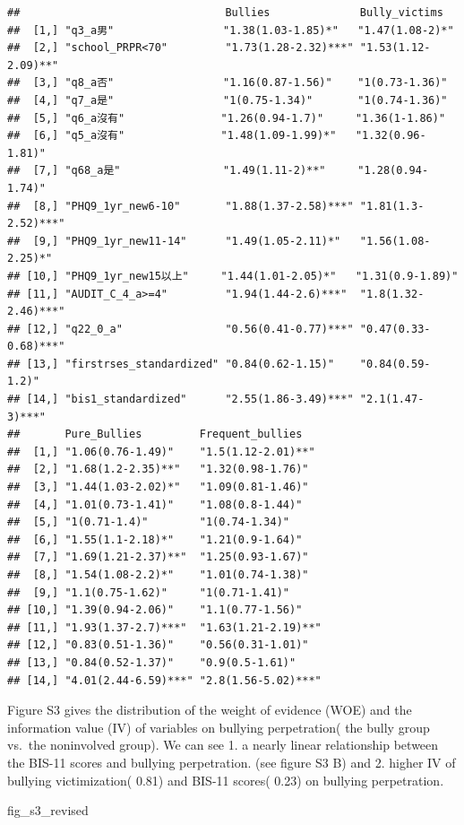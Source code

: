 \documentclass[
]{article}
\newenvironment{Shaded}{\begin{snugshade}}{\end{snugshade}}
\newcommand{\NormalTok}[1]{#1}
\begin{document}
\begin{verbatim}
##                                Bullies              Bully_victims       
##  [1,] "q3_a男"                 "1.38(1.03-1.85)*"   "1.47(1.08-2)*"     
##  [2,] "school_PRPR<70"         "1.73(1.28-2.32)***" "1.53(1.12-2.09)**" 
##  [3,] "q8_a否"                 "1.16(0.87-1.56)"    "1(0.73-1.36)"      
##  [4,] "q7_a是"                 "1(0.75-1.34)"       "1(0.74-1.36)"      
##  [5,] "q6_a沒有"               "1.26(0.94-1.7)"     "1.36(1-1.86)"      
##  [6,] "q5_a沒有"               "1.48(1.09-1.99)*"   "1.32(0.96-1.81)"   
##  [7,] "q68_a是"                "1.49(1.11-2)**"     "1.28(0.94-1.74)"   
##  [8,] "PHQ9_1yr_new6-10"       "1.88(1.37-2.58)***" "1.81(1.3-2.52)***" 
##  [9,] "PHQ9_1yr_new11-14"      "1.49(1.05-2.11)*"   "1.56(1.08-2.25)*"  
## [10,] "PHQ9_1yr_new15以上"     "1.44(1.01-2.05)*"   "1.31(0.9-1.89)"    
## [11,] "AUDIT_C_4_a>=4"         "1.94(1.44-2.6)***"  "1.8(1.32-2.46)***" 
## [12,] "q22_0_a"                "0.56(0.41-0.77)***" "0.47(0.33-0.68)***"
## [13,] "firstrses_standardized" "0.84(0.62-1.15)"    "0.84(0.59-1.2)"    
## [14,] "bis1_standardized"      "2.55(1.86-3.49)***" "2.1(1.47-3)***"    
##       Pure_Bullies         Frequent_bullies   
##  [1,] "1.06(0.76-1.49)"    "1.5(1.12-2.01)**" 
##  [2,] "1.68(1.2-2.35)**"   "1.32(0.98-1.76)"  
##  [3,] "1.44(1.03-2.02)*"   "1.09(0.81-1.46)"  
##  [4,] "1.01(0.73-1.41)"    "1.08(0.8-1.44)"   
##  [5,] "1(0.71-1.4)"        "1(0.74-1.34)"     
##  [6,] "1.55(1.1-2.18)*"    "1.21(0.9-1.64)"   
##  [7,] "1.69(1.21-2.37)**"  "1.25(0.93-1.67)"  
##  [8,] "1.54(1.08-2.2)*"    "1.01(0.74-1.38)"  
##  [9,] "1.1(0.75-1.62)"     "1(0.71-1.41)"     
## [10,] "1.39(0.94-2.06)"    "1.1(0.77-1.56)"   
## [11,] "1.93(1.37-2.7)***"  "1.63(1.21-2.19)**"
## [12,] "0.83(0.51-1.36)"    "0.56(0.31-1.01)"  
## [13,] "0.84(0.52-1.37)"    "0.9(0.5-1.61)"    
## [14,] "4.01(2.44-6.59)***" "2.8(1.56-5.02)***"
\end{verbatim}

Figure S3 gives the distribution of the weight of evidence (WOE) and the
information value (IV) of variables on bullying perpetration( the bully
group vs.~the noninvolved group). We can see 1. a nearly linear
relationship between the BIS-11 scores and bullying perpetration. (see
figure S3 B) and 2. higher IV of bullying victimization( 0.81) and
BIS-11 scores( 0.23) on bullying perpetration.

\begin{Shaded}
\begin{Highlighting}[]
\NormalTok{fig_s3_revised }
\end{Highlighting}
\end{Shaded}
\end{document}
